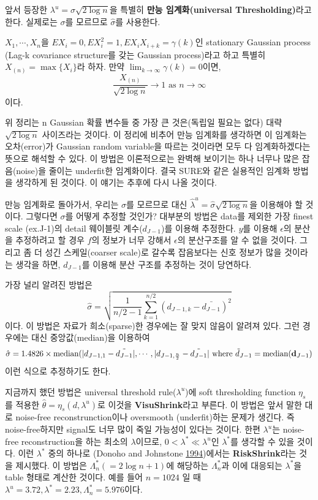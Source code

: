 \documentclass[b5paper,]{book}
\theoremstyle{definition}
\theoremstyle{definition}
\theoremstyle{definition}
\theoremstyle{remark}
\let\BeginKnitrBlock\begin \let\EndKnitrBlock\end
\begin{document}
앞서 등장한 \(\lambda^{u}=\sigma \sqrt{2 \log n}\)을 특별히 \textbf{만능
임계화(universal Thresholding)}라고 한다. 실제로는 \(\sigma\)를 모르므로
\(\hat{\sigma}\)를 사용한다.

\BeginKnitrBlock{theorem}[만능 임계화]
\protect\hypertarget{thm:unnamed-chunk-128}{}{\label{thm:unnamed-chunk-128}
{} }\(X_{1},\cdots , X_{n}\)을
\(EX_{i}=0, EX_{i}^{2}=1, EX_{i}X_{i+k}=\gamma(k)\)인 stationary
Gaussian process (Lag-k covariance structure를 갖는 Gaussian
process)라고 하고 특별히 \(X_{(n)}=\max \{ X_{i} \}\)라 하자. 만약
\(\lim_{k \rightarrow \infty} \gamma (k) =0\)이면,
\[\frac{X_{(n)}}{\sqrt{2 \log n}} \rightarrow 1 \text{ as } n \rightarrow \infty\]
이다.
\EndKnitrBlock{theorem}

위 정리는 n Gaussian 확률 변수들 중 가장 큰 것은(독립일 필요는 없다)
대략 \(\sqrt{2 \log n}\) 사이즈라는 것이다. 이 정리에 비추어 만능
임계화를 생각하면 이 임계화는 오차(error)가 Gaussian random variable을
따르는 것이라면 모두 다 임계화하겠다는 뜻으로 해석할 수 있다. 이 방법은
이론적으로는 완벽해 보이기는 하나 너무나 많은 잡음(noise)을 줄이는
underfit한 임계화이다. 결국 SURE와 같은 실용적인 임계화 방법을 생각하게
된 것이다. 이 얘기는 추후에 다시 나올 것이다.

만능 임계화로 돌아가서, 우리는 \(\sigma\)를 모르므로 대신
\(\hat{\lambda}^{u}=\hat{\sigma}\sqrt{2 \log n}\)을 이용해야 할 것이다.
그렇다면 \(\sigma\)를 어떻게 추정할 것인가? 대부분의 방법은 data를
제외한 가장 finest scale (ex.J-1)의 detail 웨이블릿 계수(\(d_{J-1}\))를
이용해 추정한다. \(y\)를 이용해 \(\epsilon\)의 분산을 추정하려고 할 경우
\(f\)의 정보가 너무 강해서 \(\epsilon\)의 분산구조를 알 수 없을 것이다.
그리고 좀 더 성긴 스케일(coarser scale)로 갈수록 잡음보다는 신호 정보가
많을 것이라는 생각을 하면, \(d_{J-1}\)를 이용해 분산 구조를 추정하는
것이 당연하다.

가장 널리 알려진 방법은
\[\hat{\sigma}=\sqrt{\frac{1}{n/2-1}\sum_{k=1}^{n/2}(d_{J-1,k}-\bar{d_{J-1}})^{2}}\]
이다. 이 방법은 자료가 희소(sparse)한 경우에는 잘 맞지 않음이 알려져
있다. 그런 경우에는 대신 중앙값(median)을 이용하여 \[
\hat{\sigma}=1.4826 \times \text{median}(|d_{J-1,1}-\tilde{d_{J-1}}|,\cdots,|d_{J-1,\frac{n}{2}}-\tilde{d_{J-1}}|\\
\text{ where } \tilde{d}_{J-1}=\text{median}(\mathbf{d}_{J-1})
\] 이런 식으로 추정하기도 한다.

지금까지 했던 방법은 universal threshold rule(\(\lambda^{u}\))에 soft
thresholding function \(\eta_{s}\)를 적용한
\(\hat{\theta}=\eta_{s}(d,\lambda^{u})\)로 이것을
\textbf{VisuShrink}라고 부른다. 이 방법은 앞서 말한 대로 noise-free
reconstrunction이나 oversmooth (underfit)하는 문제가 생긴다. 즉
noise-free하지만 signal도 너무 많이 죽일 가능성이 있다는 것이다. 한편
\(\lambda^{u}\)는 noise-free reconstruction을 하는 최소의
\(\lambda\)이므로, \(0< \lambda^{*} \ll \lambda^{u}\)인
\(\lambda^{*}\)를 생각할 수 있을 것이다. 이런 \(\lambda^{*}\) 중의
하나로 (Donoho and Johnstone
\protect\hyperlink{ref-Donoho1994}{1994})에서는 \textbf{RiskShrink}라는
것을 제시했다. 이 방법은 \(\Lambda_{n}^{*}(=2 \log n +1)\)에 해당하는
\(\Lambda_{n}^{*}\)과 이에 대응되는 \(\lambda^{*}\)을 table 형태로
계산한 것이다. 예를 들어 \(n=1024\) 일 때
\(\lambda^{u}=3.72, \lambda^{*}=2.23, \Lambda_{n}^{*}=5.976\)이다.
\end{document}
